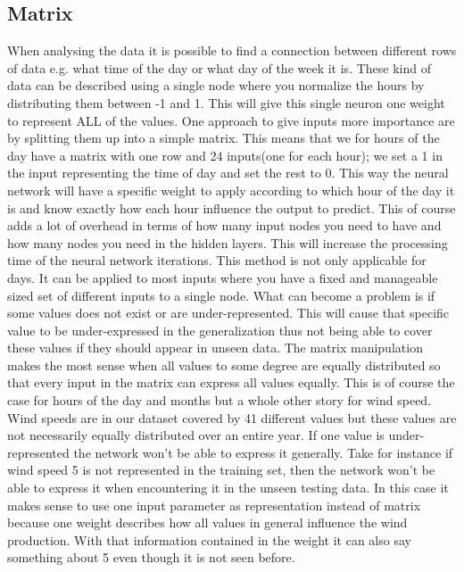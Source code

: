 \subsection{Matrix}
\label{sec:Matrix}
When analysing the data it is possible to find a connection between different rows of data e.g. what time of the day or what day of the week it is. These kind of data can be described using a single node where you normalize the hours by distributing them between -1 and 1. This will give this single neuron one weight to represent ALL of the values. One approach to give inputs more importance are by splitting them up into a simple matrix. This means that we for hours of the day have a matrix with one row and 24 inputs(one for each hour); we set a 1 in the input representing the time of day and set the rest to 0. This way the neural network will have a specific weight to apply according to which hour of the day it is and know exactly how each hour influence the output to predict. This of course adds a lot of overhead in terms of how many input nodes you need to have and how many nodes you need in the hidden layers. This will increase the processing time of the neural network iterations. This method is not only applicable for days. It can be applied to most inputs where you have a fixed and manageable sized set of different inputs to a single node. What can become a problem is if some values does not exist or are under-represented. This will cause that specific value to be under-expressed in the generalization thus not being able to cover these values if they should appear in unseen data. The matrix manipulation makes the most sense when all values to some degree are equally distributed so that every input in the matrix can express all values equally. This is of course the case for hours of the day and months but a whole other story for wind speed. Wind speeds are in our dataset covered by 41 different values but these values are not necessarily equally distributed over an entire year. If one value is under-represented the network won't be able to express it generally. Take for instance if wind speed 5 is not represented in the training set, then the network won't be able to express it when encountering it in the unseen testing data. In this case it makes sense to use one input parameter as representation instead of matrix because one weight describes how all values in general influence the wind production. With that information contained in the weight it can also say something about 5 even though it is not seen before.

